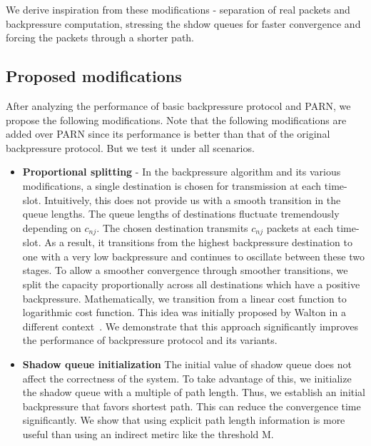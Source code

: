 We derive inspiration from these modifications - separation of real packets and backpressure computation, stressing the shdow queues for faster convergence and forcing the packets through a shorter path.

\subsection{Proposed modifications}
After analyzing the performance of basic backpressure protocol and PARN, we propose the following modifications. Note that the following modifications are added over PARN since its performance is better than that of the original backpressure protocol. But we test it under all scenarios.

\begin{itemize}
\item \textbf{Proportional splitting} - In the backpressure algorithm and its various modifications, a single destination is chosen for transmission at each time-slot. Intuitively, this does not provide us with a smooth transition in the queue lengths. The queue lengths of destinations fluctuate tremendously depending on $c_{nj}$. The chosen destination transmits $c_{nj}$ packets at each time-slot. As a result, it transitions from the highest backpressure destination to one with a very low backpressure and continues to oscillate between these two stages. To allow a smoother convergence through smoother transitions, we split the capacity proportionally across all destinations which have a positive backpressure. Mathematically, we transition from a linear cost function to logarithmic cost function. This idea was initially proposed by Walton in a different context~\cite{walton}. We demonstrate that this approach significantly improves the performance of backpressure protocol and its variants.
   
\item \textbf{Shadow queue initialization}  The initial value of shadow queue does not affect the correctness of the system. To take advantage of this, we initialize the shadow queue with a multiple of path length. Thus, we establish an initial backpressure that favors shortest path. This can reduce the convergence time significantly. We show that using explicit path length information is more useful than using an indirect metirc like the threshold M.

\end{itemize}
 